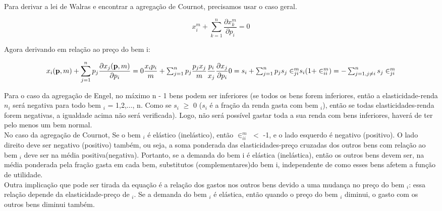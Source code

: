 \documentclass[a4paper, 12pt]{article} %
\begin{document}
\begin{flushleft}
Para derivar a lei de Walras e encontrar a agregação de Cournot, precisamos usar o caso geral.

\begin{equation}
	x_{i}^{m} + \sum_{k=1}^{n} \dfrac{\partial x_{k}^{m}}{\partial p_{i}} = 0
\end{equation}

Agora derivando em relação ao preço do bem i:

\begin{equation}
	x_{i}(\textbf{p}, m) + \sum_{j=1}^{n}p_{j} \dfrac{\partial x_{j}(\textbf{p}, m)}{\partial p_{i}} = 0 
	$$\\$$
	\dfrac{x_{i}p_{i}}{m} + \sum_{j=1}^{n}p_{j} \dfrac{p_{j}x_{j}}{m}\dfrac{p_{i}}{x_{j}} \dfrac{\partial x_{j}}{\partial p_{i}}
	$$\\$$
	0 = s_{i} + \sum_{j=1}^{n}p_{j} s_{j} \in_{ji}^{m}
	$$\\$$
	s_{i}(1 + \in_{ii}^{m}) = - \sum_{j=1, j\neq i}^{n} s_{j} \in_{ji}^{m}
\end{equation}

Para o caso da agregação de Engel, no máximo n - 1 bens podem ser inferiores (se todos os bens forem inferiores, então a elasticidade-renda $n_{i}$ será negativa para todo bem $_{i}$ = 1,2,$\ldots$, n. Como se $s_{i}$ $\geq$ 0 ($s_{i}$ é a fração da renda gasta com bem $_{i}$), então se todas elasticidades-renda forem negativas, a igualdade acima não será verificada). Logo, não será possível gastar toda a sua renda com bens inferiores, haverá de ter pelo menos um bem normal.
\\
No caso da agregação de Cournot, Se o bem $_{i}$ é elástico (inelástico), então $\in_{ii}^{m}$ $<$ -1, e o lado esquerdo é negativo (positivo). O lado direito deve ser negativo (positivo) também, ou seja, a soma ponderada das
elasticidades-preço cruzadas dos outros bens com relação ao bem $_{i}$ deve ser na média positiva(negativa). Portanto, se a demanda do bem i é elástica (inelástica), então os outros bens devem ser, na média ponderada pela fração gasta em cada bem, substitutos (complementares)do bem i, independente de como esses bens afetem a função de utilidade.
\\
Outra implicação que pode ser tirada da equação é a relação dos gastos nos outros bens devido a uma mudança no preço do bem $_{i}$: essa relação depende da elasticidade-preço de $_{i}$. Se a demanda do bem $_{i}$ é elástica, então quando o preço do bem $_{i}$ diminui, o gasto com os outros bens diminui também. 
\singlespacing


\end{flushleft}
\end{document}
